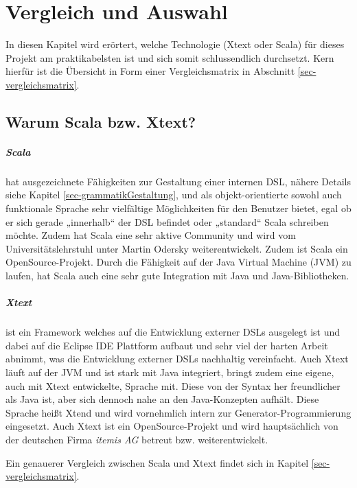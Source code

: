 \chapter{Vergleich und Auswahl}

In diesen Kapitel wird erörtert, welche Technologie (Xtext oder Scala) für
dieses Projekt am praktikabelsten ist und sich somit schlussendlich durchsetzt.
Kern hierfür ist die Übersicht in Form einer Vergleichsmatrix in Abschnitt
\ref{sec-vergleichsmatrix}.

\section{Warum Scala bzw. Xtext?}\label{sec-warumAusgewaehlt}

\paragraph{Scala}
hat ausgezeichnete Fähigkeiten zur Gestaltung einer
internen DSL, nähere Details siehe Kapitel \ref{sec-grammatikGestaltung},
und als objekt-orientierte sowohl auch funktionale Sprache sehr
vielfältige Möglichkeiten für den Benutzer bietet, egal ob er sich
gerade „innerhalb“ der DSL befindet oder „standard“ Scala schreiben
möchte. Zudem hat Scala eine sehr aktive Community und wird vom
Universitätslehrstuhl unter Martin Odersky weiterentwickelt.
Zudem ist Scala ein OpenSource-Projekt.
Durch die Fähigkeit auf der Java Virtual Machine (JVM) zu laufen,
hat Scala auch eine sehr gute Integration mit Java und
Java-Bibliotheken.

\paragraph{Xtext} ist ein Framework welches auf die Entwicklung externer DSLs
ausgelegt ist und dabei auf die Eclipse IDE Plattform aufbaut
und sehr viel der harten Arbeit abnimmt, was die Entwicklung
externer DSLs nachhaltig vereinfacht.
Auch Xtext läuft auf der JVM und ist stark mit Java integriert, bringt
zudem eine eigene, auch mit Xtext entwickelte, Sprache mit. Diese von der
Syntax her freundlicher als Java ist, aber sich dennoch nahe an den
Java-Konzepten aufhält. Diese Sprache heißt Xtend und wird vornehmlich
intern zur Generator-Programmierung eingesetzt.
Auch Xtext ist ein OpenSource-Projekt und wird hauptsächlich von der
deutschen Firma \emph{itemis AG} betreut bzw. weiterentwickelt.

Ein genauerer Vergleich
zwischen Scala und Xtext findet sich in Kapitel \ref{sec-vergleichsmatrix}.

